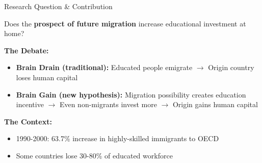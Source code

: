 \documentclass{beamer}
\begin{document}
\begin{frame}{Research Question \& Contribution}
\begin{tcolorbox}
Does the \textbf{prospect of future migration} increase educational investment at home?
\end{tcolorbox}

\vspace{0.3cm}
\textbf{The Debate:}
\begin{itemize}
    \item \textbf{Brain Drain (traditional):} Educated people emigrate $\rightarrow$ Origin country loses human capital
    \item \textbf{Brain Gain (new hypothesis):} Migration possibility creates education incentive $\rightarrow$ Even non-migrants invest more $\rightarrow$ Origin gains human capital
\end{itemize}

\vspace{0.3cm}
\textbf{The Context:}
\begin{itemize}
    \item 1990-2000: 63.7\% increase in highly-skilled immigrants to OECD
    \item Some countries lose 30-80\% of educated workforce
\end{itemize}

\end{frame}
\end{document}
